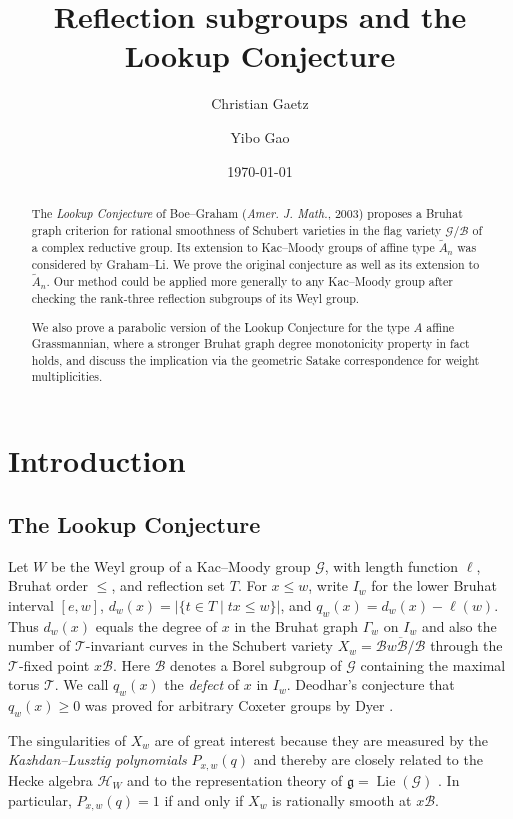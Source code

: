 \documentclass[11pt]{amsart}
\title{Reflection subgroups and the Lookup Conjecture}
\author{Christian Gaetz}
\author{Yibo Gao}
\date{\today}
\theoremstyle{definition}
\theoremstyle{remark}
\numberwithin{equation}{section}
\DeclareMathOperator{\Lie}{Lie}
\begin{document}
\begin{abstract}
The \emph{Lookup Conjecture} of Boe--Graham (\emph{Amer. J. Math.}, 2003)
proposes a Bruhat graph criterion for rational smoothness of Schubert varieties in the flag variety $\mathcal{G}/\mathcal{B}$ of a complex reductive group. Its extension to Kac--Moody groups of affine type $\widetilde{A}_n$ was considered by Graham--Li. We prove the original conjecture as well as its extension to $\widetilde{A}_n$. Our method could be applied more generally to any Kac--Moody group after checking the rank-three reflection subgroups of its Weyl group.

We also prove a parabolic version of the Lookup Conjecture for the type $A$ affine Grassmannian, where a stronger Bruhat graph degree monotonicity property in fact holds, and discuss the implication via the geometric Satake correspondence for weight multiplicities.
\end{abstract}


\maketitle
\raggedbottom
\section{Introduction}

\subsection{The Lookup Conjecture} Let $W$ be the Weyl group of a Kac--Moody group $\mathcal{G}$, with length function $\ell$, Bruhat order $\le$, and reflection set $T$. For $x\le w$, write $I_w$ for the lower Bruhat interval $[e,w]$, $d_w(x)=\lvert\{t\in T \mid tx\le w\}\rvert$, and $q_w(x)=d_w(x)-\ell(w)$. Thus $d_w(x)$ equals the degree of $x$ in the Bruhat graph $\Gamma_w$ on $I_w$ and also the number of $\mathcal{T}$-invariant curves in the Schubert variety $X_w=\overline{\mathcal{B}w\mathcal{B}/\mathcal{B}}$ through the $\mathcal{T}$-fixed point $x\mathcal{B}$. Here $\mathcal{B}$ denotes a Borel subgroup of $\mathcal{G}$ containing the maximal torus $\mathcal{T}$. We call $q_w(x)$ the \emph{defect} of $x$ in $I_w$. Deodhar's conjecture \cite{Deodhar} that $q_w(x)\ge0$ was proved for arbitrary Coxeter groups by Dyer \cite{DyerDeodhar}.

The singularities of $X_w$ are of great interest because they are measured by the \emph{Kazhdan--Lusztig polynomials} $P_{x,w}(q)$ \cite{KL} and thereby are closely related to the Hecke algebra $\mathcal{H}_W$ and to the representation theory of $\mathfrak{g}=\Lie(\mathcal{G})$ \cite{Beilinson-Bernstein, Brylinski-Kashiwara}. In particular, $P_{x,w}(q)=1$ if and only if $X_w$ is rationally smooth at $x\mathcal{B}$. 
\end{document}
